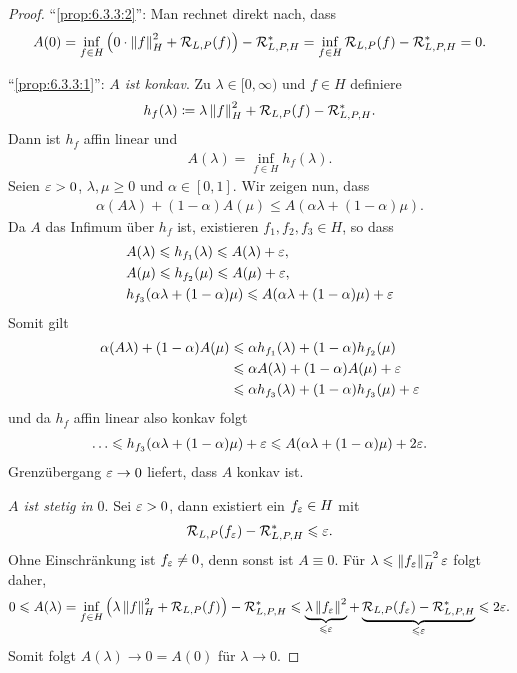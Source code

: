 \begin{proof}
"`\ref{prop:6.3.3:2}"': Man rechnet direkt nach, dass
\begin{align*}
A(0) =  \inf_{f\in H} \left(0\cdot \left\|f\right\|_H^2 + \mathcal{R}_{L,P}(f) \right) -
\mathcal{R}_{L,P,H}^*
= \inf_{f\in H} \mathcal{R}_{L,P}(f) - \mathcal{R}_{L,P,H}^* = 0.
\end{align*}

"`\ref{prop:6.3.3:1}"': \textit{$A$ ist konkav}. Zu $\lambda\in[0,\infty)$ und
$f\in H$ definiere
\begin{align*}
h_f(\lambda) \coloneq \lambda\left\|f\right\|_H^2 + \mathcal{R}_{L,P}(f) -\mathcal{R}_{L,P,H}^*. 
\end{align*}
Dann ist $h_f$ affin linear und
\begin{align*}
A(\lambda) = \inf_{f\in H} h_f(\lambda).
\end{align*}
Seien $\varepsilon > 0$, $\lambda,\mu \ge 0$ und $\alpha\in [0,1]$. Wir zeigen nun, dass
\begin{align*}
\alpha (A\lambda) + (1-\alpha)A(\mu) \le A(\alpha \lambda + (1-\alpha)\mu).
\end{align*}
Da $A$ das Infimum über $h_f$ ist, existieren $f_1,f_2,f_3\in H$, so dass
\begin{align*}
&A(\lambda) \leqslant h_{f_1}(\lambda) \leqslant A(\lambda)+ \varepsilon,\\
&A(\mu) \leqslant h_{f_2}(\mu) \leqslant A(\mu) + \varepsilon,\\
&h_{f_3}(\alpha\lambda + (1-\alpha)\mu)
\leqslant A(\alpha\lambda + (1-\alpha)\mu) + \varepsilon
\end{align*}
Somit gilt
\begin{align*}
\alpha (A\lambda) + (1-\alpha)A(\mu) &\leqslant \alpha h_{f_1}(\lambda) + (1-\alpha)
h_{f_2}(\mu)\\
&\leqslant \alpha A(\lambda) + (1-\alpha)A(\mu) + \varepsilon\\
&\leqslant \alpha h_{f_3}(\lambda) + (1-\alpha)h_{f_3}(\mu) + \varepsilon
\end{align*}
und da $h_f$ affin linear also konkav folgt
\begin{align*}
\ldots \leqslant
h_{f_3}(\alpha\lambda + (1-\alpha)\mu)+ \varepsilon
\leqslant A(\alpha \lambda + (1-\alpha)\mu) + 2\varepsilon.
\end{align*}
Grenzübergang $\varepsilon\to 0$ liefert, dass $A$ konkav ist.

\textit{$A$ ist stetig in $0$}. Sei $\varepsilon > 0$, dann existiert ein $f_\varepsilon\in H$
mit
\begin{align*}
\mathcal{R}_{L,P}(f_\varepsilon) - \mathcal{R}_{L,P,H}^* \leqslant \varepsilon.
\end{align*}
Ohne Einschränkung ist $f_\varepsilon\neq 0$, denn sonst ist $A\equiv 0$. Für
$\lambda\leqslant \left\|f_\varepsilon\right\|_H^{-2}\varepsilon$ folgt daher,
\begin{align*}
0 \leqslant A(\lambda) = \inf_{f\in H} \left(\lambda \left\|f\right\|_H^2 + \mathcal{R}_{L,P}(f)
\right) - \mathcal{R}_{L,P,H}^*
\leqslant
\underbrace{\lambda\left\|f_\varepsilon\right\|^2}_{\leqslant \varepsilon} + \underbrace{\mathcal{R}_{L,P}(f_\varepsilon) -
\mathcal{R}_{L,P,H}^*}_{\leqslant \varepsilon} \leqslant 2\varepsilon.
\end{align*}
Somit folgt $A(\lambda)\to 0 = A(0)$ für $\lambda \to 0$.


\end{proof}
